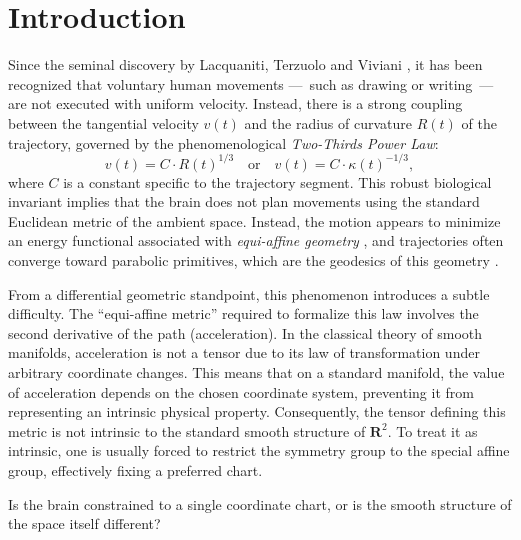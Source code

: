 \documentclass[10pt,letterpaper,reqno]{amsart}
\newcommand{\RR}{\mathbf{R}}
\begin{document}
  \section{Introduction}
  
  Since the seminal discovery by Lacquaniti, Terzuolo and Viviani \cite{LTV83},
  it has been recognized that voluntary human movements
  ---~such as drawing or writing~---
  are not executed with uniform velocity.
  Instead,
  there is a strong coupling between the tangential velocity $v(t)$ and the radius of curvature $R(t)$ of the trajectory,
  governed by the phenomenological \emph{Two-Thirds Power Law}:
  \begin{equation}
    v(t) = C \cdot R(t)^{1/3} \quad \text{or} \quad v(t) = C \cdot \kappa(t)^{-1/3},
  \end{equation}
  where $C$ is a constant specific to the trajectory segment.
  This robust biological invariant implies that the brain does not plan movements using the standard Euclidean metric of the ambient space.
  Instead,
  the motion appears to minimize an energy functional associated with \emph{equi-affine geometry} \cite{PS97},
  and trajectories often converge toward parabolic primitives, which are the geodesics of this geometry \cite{FH07, Pol09}.
  
  From a differential geometric standpoint,
  this phenomenon introduces a subtle difficulty.
  The ``equi-affine metric'' required to formalize this law involves the second derivative of the path (acceleration).
  In the classical theory of smooth manifolds,
  acceleration is not a tensor due to its law of transformation under arbitrary coordinate changes.
  This means that on a standard manifold,
  the value of acceleration depends on the chosen coordinate system,
  preventing it from representing an intrinsic physical property.
  Consequently,
  the tensor defining this metric is not intrinsic to the standard smooth structure of $\RR^2$.
  To treat it as intrinsic,
  one is usually forced to restrict the symmetry group to the special affine group,
  effectively fixing a preferred chart.
  
  Is the brain constrained to a single coordinate chart, or is the smooth structure of the space itself different?
  
\end{document}
